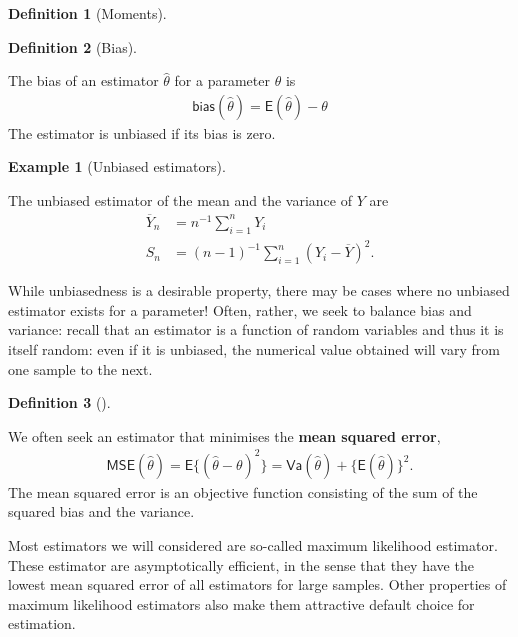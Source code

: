 \documentclass[
  11pt,
  letterpaper,
]{scrbook}
\theoremstyle{definition}
\newtheorem{definition}{Definition}[chapter]
\theoremstyle{definition}
\newtheorem{example}{Example}[chapter]
\theoremstyle{plain}
\theoremstyle{remark}
\begin{document}
\begin{definition}[Moments]
\end{definition}

\begin{definition}[Bias]\protect\hypertarget{def-bias}{}\label{def-bias}

The bias of an estimator \(\hat{\theta}\) for a parameter \(\theta\) is
\begin{align*}
 \mathsf{bias}(\hat{\theta})=\mathsf{E}(\hat{\theta})- \theta
 \end{align*} The estimator is unbiased if its bias is zero.

\end{definition}

\begin{example}[Unbiased
estimators]\protect\hypertarget{exm-unbiased-estimator}{}\label{exm-unbiased-estimator}

The unbiased estimator of the mean and the variance of \(Y\) are
\begin{align*}
\overline{Y}_n &= n^{-1} \sum_{i=1}^n Y_i\\
S_n &= (n-1)^{-1} \sum_{i=1}^n (Y_i-\overline{Y})^2.
\end{align*}

\end{example}

While unbiasedness is a desirable property, there may be cases where no
unbiased estimator exists for a parameter! Often, rather, we seek to
balance bias and variance: recall that an estimator is a function of
random variables and thus it is itself random: even if it is unbiased,
the numerical value obtained will vary from one sample to the next.

\begin{definition}[]\protect\hypertarget{def-mse}{}\label{def-mse}

We often seek an estimator that minimises the \textbf{mean squared
error}, \begin{align*}
\mathsf{MSE}(\hat{\theta}) = \mathsf{E}\{(\hat{\theta}-\theta)^2\}=\mathsf{Va}(\hat{\theta}) + \{\mathsf{E}(\hat{\theta})\}^2.
\end{align*} The mean squared error is an objective function consisting
of the sum of the squared bias and the variance.

\end{definition}

Most estimators we will considered are so-called maximum likelihood
estimator. These estimator are asymptotically efficient, in the sense
that they have the lowest mean squared error of all estimators for large
samples. Other properties of maximum likelihood estimators also make
them attractive default choice for estimation.
\end{document}
